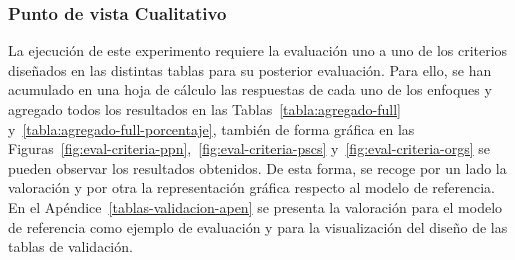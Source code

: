 \clearpage
\subsubsection{Punto de vista Cualitativo}
La ejecución de este experimento requiere la evaluación uno a uno de los criterios diseñados en las distintas 
tablas para su posterior evaluación. Para ello, se han acumulado en una hoja de cálculo las respuestas 
de cada uno de los enfoques y agregado todos los resultados en las Tablas~\ref{tabla:agregado-full} y~\ref{tabla:agregado-full-porcentaje}, 
también de forma gráfica en las Figuras~\ref{fig:eval-criteria-ppn},~\ref{fig:eval-criteria-pscs} y~\ref{fig:eval-criteria-orgs} se 
pueden observar los resultados obtenidos. De esta forma, se recoge por un lado 
la valoración y por otra la representación gráfica respecto al modelo de referencia. En el Apéndice~\ref{tablas-validacion-apen} se 
presenta la valoración para el modelo de referencia como ejemplo de evaluación y para la visualización del diseño de las 
tablas de validación.

